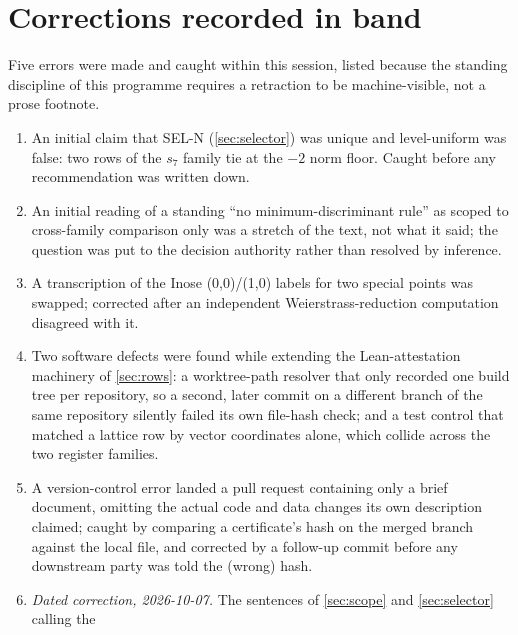 \documentclass[11pt,a4paper]{article}
\theoremstyle{remark}
\begin{document}
\begin{table}[h]
\centering

\caption{Enclosure diameters of the certified stage-two monodromy. All are many orders of magnitude below
the denominator bound required for the recognized rational to be unique.}\label{tab:monodromy}
\end{table}

\section{Corrections recorded in band}\label{sec:corrections}

\begin{correctionbox}
Five errors were made and caught within this session, listed because the standing discipline of this
programme requires a retraction to be machine-visible, not a prose footnote.
\begin{enumerate}
\item An initial claim that SEL-N (\cref{sec:selector}) was unique and level-uniform was false: two rows
  of the $s_7$ family tie at the $-2$ norm floor. Caught before any recommendation was written down.
\item An initial reading of a standing ``no minimum-discriminant rule'' as scoped to cross-family
  comparison only was a stretch of the text, not what it said; the question was put to the decision
  authority rather than resolved by inference.
\item A transcription of the Inose (0,0)/(1,0) labels for two special points was swapped; corrected after
  an independent Weierstrass-reduction computation disagreed with it.
\item Two software defects were found while extending the Lean-attestation machinery of
  \cref{sec:rows}: a worktree-path resolver that only recorded one build tree per repository, so a
  second, later commit on a different branch of the same repository silently failed its own file-hash
  check; and a test control that matched a lattice row by vector coordinates alone, which collide across
  the two register families.
\item A version-control error landed a pull request containing only a brief document, omitting the
  actual code and data changes its own description claimed; caught by comparing a certificate's hash on
  the merged branch against the local file, and corrected by a follow-up commit before any downstream
  party was told the (wrong) hash.
\item \emph{Dated correction, 2026-10-07.} The sentences of \cref{sec:scope} and \cref{sec:selector} calling the

\end{enumerate}
\end{correctionbox}
\end{document}
